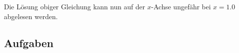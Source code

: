 Die Lösung obiger Gleichung kann nun auf der $x$-Achse ungefähr bei $x=1.0$ abgelesen werden.
\newpage

\subsection*{Aufgaben}
\newpage

\GESO{\newpage }
\newpage%
